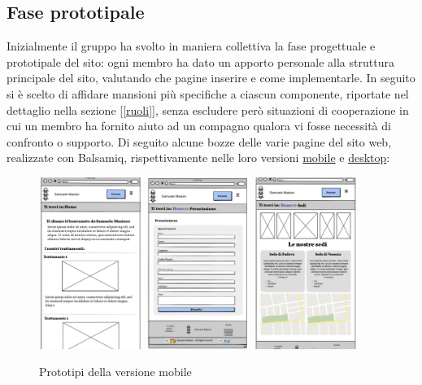 \documentclass{article}
\begin{document}
\subsection{Fase prototipale} \label{faseprototipale}
Inizialmente il gruppo ha svolto in maniera collettiva la fase progettuale e prototipale del sito: ogni membro ha dato un apporto personale alla struttura principale del sito, valutando che pagine inserire e come implementarle. In seguito si è scelto di affidare mansioni più specifiche a ciascun componente, riportate nel dettaglio nella sezione [\ref{ruoli}], senza escludere però situazioni di cooperazione in cui un membro ha fornito aiuto ad un compagno qualora vi fosse necessità di confronto o supporto.
\newline Di seguito alcune bozze delle varie pagine del sito web, realizzate con Balsamiq, rispettivamente nelle loro versioni \hyperref[fig:mockup_mobile]{mobile} e \hyperref[fig:mockup_desktop]{desktop}:
\begin{figure} [h] \label{fig:mockup_mobile}
    \centering
    \includegraphics[width=0.3\textwidth]{immagini/homepage_mobile.jpg}
    \includegraphics[width=0.3\textwidth]{immagini/prenotazione_mobile.jpg}
    \includegraphics[width=0.3\textwidth]{immagini/sedi_mobile.jpg}
    \caption{Prototipi della versione mobile}
\end{figure}
\end{document}
